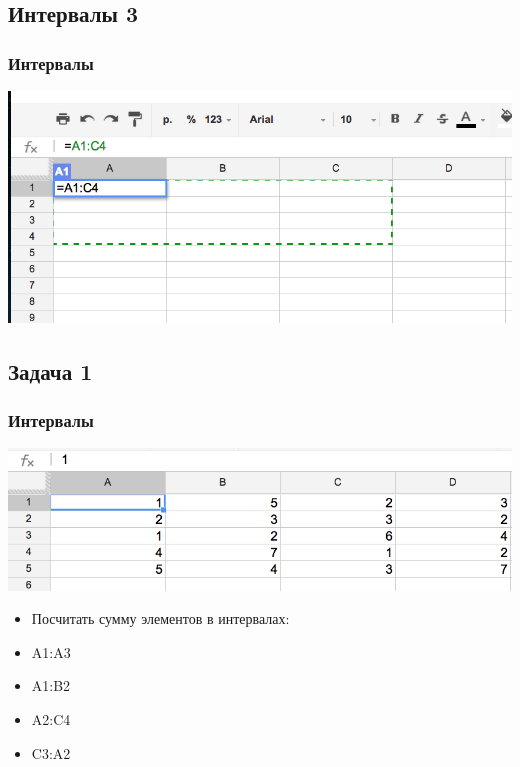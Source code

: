 \documentclass[compress,red]{beamer}
\begin{document}
\subsection{Интервалы 3}
\begin{frame}[fragile]
  \frametitle{Интервалы}
  \centerline{\includegraphics[width=1.0\textwidth]{images/01.png}}
\end{frame}

\subsection{Задача 1}
\begin{frame}[fragile]
  \frametitle{Интервалы}
  \centerline{\includegraphics[width=1.0\textwidth]{images/04.png}}
  \begin{itemize}[<+->]
      \item Посчитать сумму элементов в интервалах:
      \item A1:A3
      \item A1:B2
      \item A2:C4
      \item C3:A2
  \end{itemize}
\end{frame}
\end{document}
